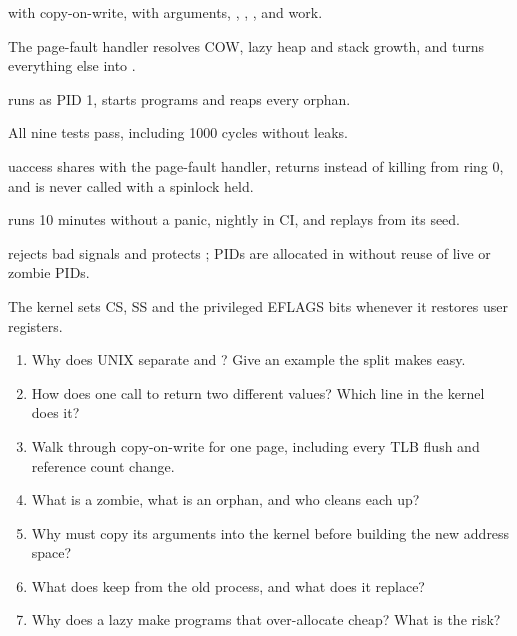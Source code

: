 \documentclass[11pt,a4paper]{article}
\begin{document}
\begin{milestonebox}
\begin{checklist}
  \item {} with copy-on-write,  with arguments, , , ,  and  work.
  \item The page-fault handler resolves COW, lazy heap and stack growth, and turns everything else into .
  \item {} runs as PID 1, starts programs and reaps every orphan.
  \item All nine tests pass, including 1000 cycles without leaks.
  \item uaccess shares  with the page-fault handler, returns  instead of killing from ring 0, and is never called with a spinlock held.
  \item {} runs 10 minutes without a panic, nightly in CI, and replays from its seed.
  \item {} rejects bad signals and protects ; PIDs are allocated in  without reuse of live or zombie PIDs.
  \item The kernel sets CS, SS and the privileged EFLAGS bits whenever it restores user registers.
\end{checklist}
\end{milestonebox}

\begin{questionbox}
\begin{enumerate}
  \item Why does UNIX separate  and ? Give an example the split makes easy.
  \item How does one call to  return two different values? Which line in the kernel does it?
  \item Walk through copy-on-write for one page, including every TLB flush and reference count change.
  \item What is a zombie, what is an orphan, and who cleans each up?
  \item Why must  copy its arguments into the kernel before building the new address space?
  \item What does  keep from the old process, and what does it replace?
  \item Why does a lazy  make programs that over-allocate cheap? What is the risk?
\end{enumerate}
\end{questionbox}
\end{document}
